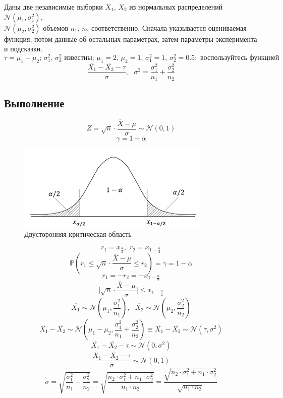 \documentclass[a4paper, 12pt]{article}
\begin{document}
    Даны две независимые выборки $X_1$, $X_2$ из нормальных распределений $\mathcal{N}\left(\mu_1,\sigma_1^2\right)$,\\
    $\mathcal{N}(\mu_2,\sigma_2^2)$ объемов $n_1$, $n_2$ соответственно.
    Сначала указывается оцениваемая функция, потом данные об остальных параметрах, затем параметры эксперимента и подсказки.
    $$\tau=\mu_1-\mu_2;\,\sigma_1^2,\,\sigma_2^2\text{ известны};\,\mu_1=2,\,\mu_2=1,\,\sigma_1^2=1,\,\sigma_2^2=0.5;\text{ воспользуйтесь функцией}$$
    $$\dfrac{\overline{X_1}-\overline{X_2}-\tau}{\sigma},\,\,\,\,\sigma^2=\dfrac{\sigma_1^2}{n_1}+\dfrac{\sigma_2^2}{n_2}$$


    \subsection{Выполнение}
    $$Z=\sqrt{n}\cdot\dfrac{\overline{X}-\mu}{\sigma}\sim\mathcal{N}\left(0,1\right)$$
    $$\gamma=1-\alpha$$
    \begin{figure}[H]
        \centering
        \includegraphics[scale=1.2]{normal.png}
        \captionsetup{skip=0pt}
        \caption{Двусторонняя критическая область}
        \label{fig:normal}
    \end{figure}
    $$r_1=x_{\frac{\alpha}{2}},\,\,r_2=x_{1-\frac{\alpha}{2}}$$
    $$\mathbb{P}\left(r_1\leq\sqrt{n}\cdot\dfrac{\overline{X}-\mu}{\sigma}\leq r_2\right)=\gamma=1-\alpha$$
    $$r_1=-r_2=-x_{1-\frac{\alpha}{2}}$$
    $$\Bigg|\sqrt{n}\cdot\dfrac{\overline{X}-\mu}{\sigma}\Bigg|\leq x_{1-\frac{\alpha}{2}}$$
    $$\overline{X_1}\sim\mathcal{N}\left(\mu_1,\dfrac{\sigma_1^2}{n_1}\right),\,\,\,\,\overline{X_2}\sim\mathcal{N}\left(\mu_2,\dfrac{\sigma_2^2}{n_2}\right)$$
    $$\overline{X_1}-\overline{X_2}\sim\mathcal{N}\left(\mu_1-\mu_2,\dfrac{\sigma_1^2}{n_1}+\dfrac{\sigma_2^2}{n_2}\right)\equiv\overline{X_1}-\overline{X_2}\sim\mathcal{N}\left(\tau,\sigma^2\right)$$
    $$\overline{X_1}-\overline{X_2}-\tau\sim\mathcal{N}\left(0,\sigma^2\right)$$
    $$\dfrac{\overline{X_1}-\overline{X_2}-\tau}{\sigma}\sim\mathcal{N}\left(0,1\right)$$
    $$\sigma=\sqrt{\dfrac{\sigma_1^2}{n_1}+\dfrac{\sigma_2^2}{n_2}}=\sqrt{\dfrac{n_2\cdot\sigma_1^2+n_1\cdot\sigma_2^2}{n_1\cdot n_2}}=\dfrac{\sqrt{n_2\cdot\sigma_1^2+n_1\cdot\sigma_2^2}}{\sqrt{n_1\cdot n_2}}$$
\end{document}
